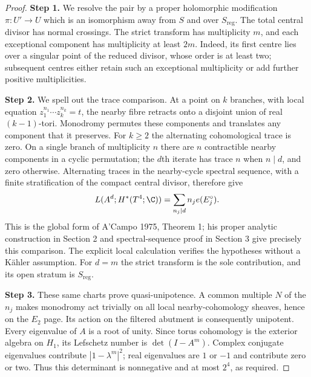 \begin{proof}
\noindent\textbf{Step 1.} We resolve the pair by a proper holomorphic modification
$\pi:U'\to U$ which is an isomorphism away from $S$ and over
$S_{\mathrm{reg}}$. The total central divisor has normal crossings.
The strict transform has multiplicity $m$, and each exceptional
component has multiplicity at least $2m$. Indeed, its first centre
lies over a singular point of the reduced divisor, whose order is
at least two; subsequent centres either retain such an exceptional
multiplicity or add further positive multiplicities.

\noindent\textbf{Step 2.} We spell out the trace comparison. At a point on $k$ branches,
with local equation $z_1^{n_1}\cdots z_k^{n_k}=t$, the nearby
fibre retracts onto a disjoint union of real $(k-1)$-tori.
Monodromy permutes these components and translates any component
that it preserves. For $k\ge2$ the alternating cohomological
trace is zero. On a single branch of multiplicity $n$ there are
$n$ contractible nearby components in a cyclic permutation;
the $d$th iterate has trace $n$ when $n\mid d$, and zero otherwise.
Alternating traces in the nearby-cycle spectral sequence, with a
finite stratification of the compact central divisor, therefore give
\[
 L(A^d;H^*(T^4;\C))=\sum_{n_j\mid d}n_j e(E_j^\circ).
\]
This is the global form of A'Campo 1975, Theorem 1; his proper
analytic construction in Section 2 and spectral-sequence proof in
Section 3 give precisely this comparison. The explicit local
calculation verifies the hypotheses without a Kähler assumption.
For $d=m$ the strict transform is the sole contribution, and its
open stratum is $S_{\mathrm{reg}}$.

\noindent\textbf{Step 3.} These same charts prove quasi-unipotence. A common multiple $N$
of the $n_j$ makes monodromy act trivially on all local
nearby-cohomology sheaves, hence on the $E_2$ page. Its action
on the filtered abutment is consequently unipotent. Every
eigenvalue of $A$ is a root of unity. Since torus cohomology is
the exterior algebra on $H_1$, its Lefschetz number is
$\det(I-A^m)$. Complex conjugate eigenvalues contribute
$|1-\lambda^m|^2$; real eigenvalues are $1$ or $-1$ and
contribute zero or two. Thus this determinant is nonnegative
and at most $2^4$, as required.
\end{proof}

